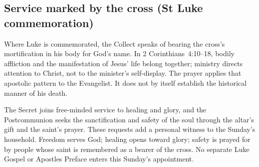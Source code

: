 \subsection{Service marked by the cross (St Luke commemoration)}
Where Luke is commemorated, the Collect speaks of bearing the cross's
mortification in his body for God's name. In 2 Corinthians~4:10--18,
bodily affliction and the manifestation of Jesus' life belong together;
ministry directs attention to Christ, not to the minister's self-display.
The prayer applies that apostolic pattern to the Evangelist. It does
not by itself establish the historical manner of his death.

The Secret joins free-minded service to healing and glory, and the
Postcommunion seeks the sanctification and safety of the soul through
the altar's gift and the saint's prayer. These requests add a personal
witness to the Sunday's household. Freedom serves God; healing opens
toward glory; safety is prayed for by people whose saint is remembered
as a bearer of the cross. No separate Luke Gospel or Apostles Preface
enters this Sunday's appointment.
